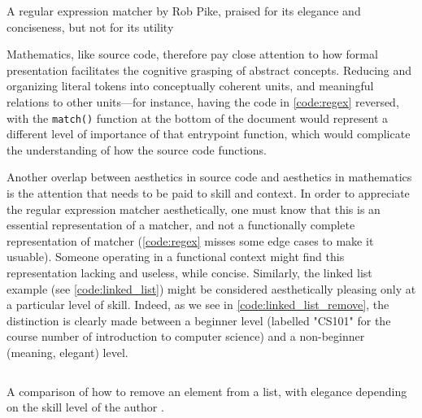 \begin{listing}
    \inputminted{c}{./corpus/regex.c}
    \caption{A regular expression matcher by Rob Pike, praised for its elegance and conciseness, but not for its utility \citep{oram_beautiful_2007}}
    \label{code:regex}
\end{listing}

Mathematics, like source code, therefore pay close attention to how formal presentation facilitates the cognitive grasping of abstract concepts. Reducing and organizing literal tokens into conceptually coherent units, and meaningful relations to other units—for instance, having the code in \ref{code:regex} reversed, with the \lstinline{match()} function at the bottom of the document would represent a different level of importance of that entrypoint function, which would complicate the understanding of how the source code functions.

Another overlap between aesthetics in source code and aesthetics in mathematics is the attention that needs to be paid to skill and context. In order to appreciate the regular expression matcher aesthetically, one must know that this is an essential representation of a matcher, and not a functionally complete representation of matcher (\ref{code:regex} misses some edge cases to make it usuable). Someone operating in a functional context might find this representation lacking and useless, while concise. Similarly, the linked list example (see \ref{code:linked_list}) might be considered aesthetically pleasing only at a particular level of skill. Indeed, as we see in \ref{code:linked_list_remove}, the distinction is clearly made between a beginner level (labelled "CS101" for the course number of introduction to computer science) and a non-beginner (meaning, elegant) level.

\begin{listing}
    \inputminted{c}{./corpus/linked_list.c}
    \caption{A comparison of how to remove an element from a list, with elegance depending on the skill level of the author \citep{kirchner_content_2022a}.}
    \label{code:linked_list_remove}
\end{listing}

